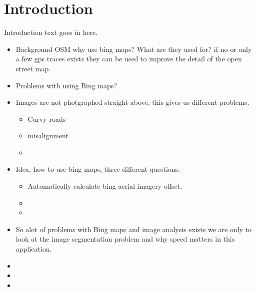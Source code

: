 \newpage
\section{Introduction}
Introduction text goes in here.

\begin{itemize}
    \item Background OSM why use bing maps? What are they used for? if no or only
        a few gps traces exists they can be used to improve the detail of the 
        open street map.
    \item Problems with using Bing maps?
    \item Images are not photgraphed straight above, this gives us different problems.
        \begin{itemize}
            \item Curvy roads
            \item misalignment
            \item
        \end{itemize}
    \item Idea, how to use bing maps, three different questions.
        \begin{itemize}
            \item Automatically calculate bing aerial imagery offset.
            \item
            \item
        \end{itemize}
    \item So alot of problems with Bing maps and image analysis exists
        we are only to look at the image segmentation problem
        and why speed matters in this application.
    \item
    \item
    \item
\end{itemize}

